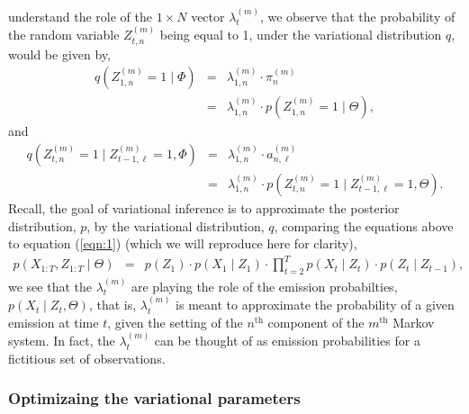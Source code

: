 \documentclass{amsart}
\begin{document}
understand the role of the $1\times N$ vector $\lambda_t^{(m)}$, we observe that the probability of the random 
variable $Z_{t,n}^{(m)}$ being equal to 1, under the variational
distribution $q$, would be given by,
\begin{eqnarray*}
q(Z_{1,n}^{(m)} = 1\mid \Phi) &=& \lambda_{1,n}^{(m)}\cdot \pi_n^{(m)} \\
& = &  
\lambda_{1,n}^{(m)}\cdot p(Z_{1,n}^{(m)} = 1\mid \Theta),
\end{eqnarray*}
and 
\begin{eqnarray*}
q(Z_{t,n}^{(m)}=1\mid Z_{t-1,\ell}^{(m)} =1, \Phi) &=&  
\lambda_{1,n}^{(m)}\cdot a_{n,\ell}^{(m)}\\
& = & \lambda_{1,n}^{(m)}\cdot p(Z_{t,n}^{(m)}=1\mid 
Z_{t-1,\ell}^{(m)}=1,\Theta).
\end{eqnarray*}
Recall, the goal of variational inference is to approximate 
the posterior distribution, $p$, by the variational distribution, $q$, 
comparing the equations above to equation 
(\ref{eqn:1}) (which we will reproduce here for clarity),
\begin{eqnarray*}
p(X_{1:T},Z_{1:T}\mid \Theta) & = & p(Z_1)\cdot p(X_1\mid Z_1)\cdot 
\prod_{t=2}^Tp(X_t\mid Z_t)\cdot p(Z_t\mid Z_{t-1}),
\end{eqnarray*} 
we see that the $\lambda_t^{(m)}$ are playing the role of the 
emission probabilties, $p(X_t\mid Z_t, \Theta)$, that is, 
$\lambda_t^{(m)}$ is meant to approximate the probability of a given 
emission at time $t$, given the setting of the $n^\text{th}$ component 
of the $m^\text{th}$ Markov system.  In fact, the $\lambda_t^{(m)}$ can 
be thought of as emission probabilities for a fictitious set of 
observations. 

\subsubsection{Optimizaing the variational parameters}
\end{document}
